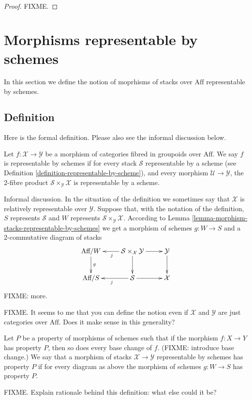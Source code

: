 \begin{proof}
FIXME.
\end{proof}

\section{Morphisms representable by schemes}
\label{section-morphisms-representable-by-schemes}

\noindent
In this section we define the notion of moprhisms of stacks over $\text{Aff}$
representable by schemes.

\subsection{Definition}
\label{subsection-definition-representable-by-schemes}

\noindent
Here is the formal definition. Please also see the informal discussion below.

\begin{definition}
\label{definition-representable-by-schemes}
Let $f : \mathcal{X} \to \mathcal{Y}$ be a morphism of categories
fibred in groupoids over $\text{Aff}$. We say $f$ is representable by
schemes if for every stack $\mathcal{S}$ representable by a scheme
(see Definition \ref{definition-representable-by-scheme}), and every morphism
$\mathcal{U} \to \mathcal{Y}$, the 2-fibre product
$\mathcal{S}\times_\mathcal{Y}\mathcal{X}$ is representable by a scheme.
\end{definition}

\noindent
Informal discussion. In the situation of the definition we sometimes 
say that $\mathcal{X}$ is relatively representable over $\mathcal{Y}$.
Suppose that, with the notation of the definition, $S$ represents
$\mathcal{S}$ and $W$ represents $\mathcal{S}\times_\mathcal{Y}\mathcal{X}$.
According to Lemma \ref{lemma-morphism-stacks-representable-by-schemes}
we get a morphism of schemes $g : W \to S$ and a 2-commutative diagram
of stacks
$$
\xymatrix{
\text{Aff}/W \ar[d]^g &
\mathcal{S}\times_\mathcal{X}\mathcal{Y} \ar[d] \ar[l]^j \ar[r] &
\mathcal{Y} \ar[d] \\
\text{Aff}/S &
\mathcal{S} \ar[l]^j \ar[r] & \mathcal{X}
}
$$
FIXME: more.

\smallskip\noindent
FIXME. It seems to me that you can define the notion even if 
$\mathcal{X}$ and $\mathcal{Y}$ are just categories over $\text{Aff}$. Does
it make sense in this generality?

\begin{definition}
\label{definition-property-morphism-representable-by-schemes}
Let $P$ be a property of morphisms of schemes such that
if the morphism $f : X \to Y$ has property $P$, then so does
every base change of $f$. (FIXME: introduce base change.)
We say that a morphism of stacks $\mathcal{X}
\to \mathcal{Y}$ representable by schemes has property
$P$ if for every diagram as above the morphism of schemes
$g : W \to S$ has property $P$.
\end{definition}

\noindent
FIXME. Explain rationale behind this definition: what else could it be?







